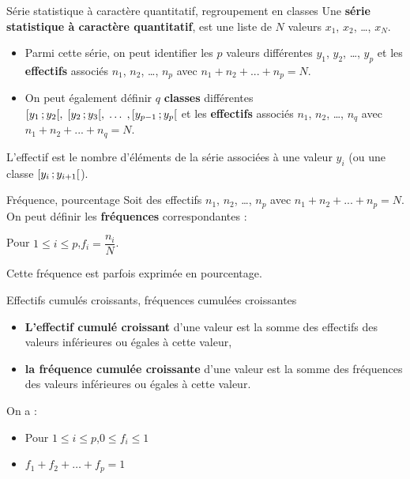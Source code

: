 \documentclass[10pt,a4paper,openany,twoside, eleve]{book}
\begin{document}
\begin{defi}{Série statistique à caractère quantitatif, regroupement en classes}{}
   Une \textbf{série statistique à caractère quantitatif}, est une liste de $N$ valeurs $x_1$,\; $x_2$,\; \dots,\; $x_N$.

   \begin{itemize}
      \item
      Parmi cette série, on peut identifier les $p$ valeurs différentes $y_1$,\; $y_2$,\; \dots,\; $y_p$ et les \textbf{effectifs} associés $n_1$,\; $n_2$,\; \dots,\; $n_p$ avec $n_1+n_2+...+n_p=N$.
      \item On peut également définir $q$ \textbf{classes} différentes $\mathopen{[}y_1\mathclose{}\mathpunct{};y_2\mathclose{[},\; \mathopen{[}y_2\mathclose{}\mathpunct{};y_3\mathclose{[},\; \dots\;, \mathopen{[}y_{p-1}\mathclose{}\mathpunct{};y_p\mathclose{[}$ et les \textbf{effectifs} associés $n_1$,\; $n_2$,\; \dots,\; $n_q$ avec $n_1+n_2+...+n_q=N$.
   \end{itemize}

   L'effectif est le nombre d'éléments de la série associées à une valeur $y_i$ (ou une classe $\mathopen{[}y_i\mathclose{}\mathpunct{};y_{i+1}\mathclose{[}$).
\end{defi}

\begin{defi}{Fréquence, pourcentage}{}
   Soit des effectifs $n_1$, $n_2$, \dots, $n_p$ avec $n_1+n_2+...+n_p=N$. On peut définir les \textbf{fréquences} correspondantes :

   Pour $1\le i\le p$,\quad $f_i=\dfrac{n_i}{N}$.

   \smallskip
   Cette fréquence est parfois exprimée en pourcentage.
\end{defi}

\begin{defi}{Effectifs cumulés croissants, fréquences cumulées croissantes}{}
   \begin{itemize}
      \item  \textbf{L'effectif cumulé croissant} d'une valeur est la somme des effectifs des valeurs inférieures ou égales à cette valeur,
      \item  \textbf{la fréquence cumulée croissante} d'une valeur est la somme des fréquences des valeurs inférieures ou égales à cette valeur.
   \end{itemize}
\end{defi}

\begin{prop}{}{}
   On a :
      \begin{itemize}
         \item Pour $1\le i\le p$,\quad $0\le f_i \le 1$
         \item
         $f_1+f_2+\dots+f_p=1$
      \end{itemize}
\end{prop}
\end{document}
